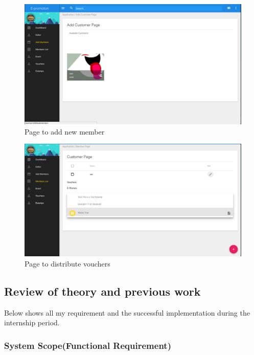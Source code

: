 \documentclass[12pt]{scrartcl}
\begin{document}
\begin{figure}[htbp]
\caption{\label{fig:org07b2067}
Page to add new member}
\centering
\includegraphics[width=.9\linewidth]{./img/customer.png}
\end{figure}
\begin{figure}[htbp]
\caption{\label{fig:orgfa04102}
Page to distribute vouchers}
\centering
\includegraphics[width=.9\linewidth]{./img/distribute.png}
\end{figure}

\subsection{Review of theory and previous work}
\label{sec:orgbb5dc66}
Below shows all my requirement and the successful implementation during the
internship period.
\subsubsection{System Scope(Functional Requirement)}
\label{sec:org3977c02}
\end{document}
